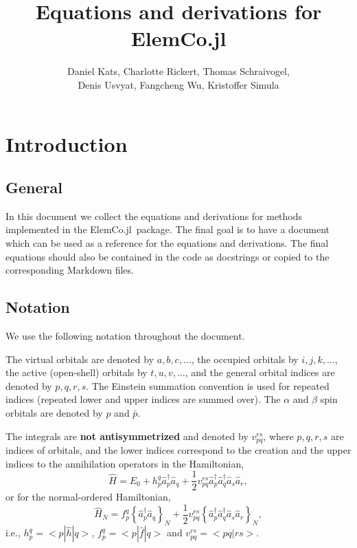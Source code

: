 \documentclass[a4paper,12pt,oneside]{book}
\newcommand{\op}{\hat}
\newcommand{\spa}[1]{{#1}}
\newcommand{\spb}[1]{\bar{#1}}
\newcommand{\elemcoil}{\textsf{ElemCo.jl}}
\begin{document}
\title{Equations and derivations for \elemcoil}
\author{Daniel Kats, Charlotte Rickert, Thomas Schraivogel,\\ Denis Usvyat, Fangcheng Wu, Kristoffer Simula}
\maketitle
\tableofcontents
\chapter{Introduction}
\section{General}
In this document we collect the equations and derivations for methods implemented in the \elemcoil\ package.
The final goal is to have a document which can be used as a reference for the equations and derivations.
The final equations should also be contained in the code as docstrings or copied to the corresponding Markdown files.

\section{Notation} \label{sec:notation}

We use the following notation throughout the document.

The virtual orbitals are denoted by $a,b,c,\ldots$, the occupied orbitals by $i,j,k,\ldots$,
the active (open-shell) orbitals by $t,u,v,\ldots$,
and the general orbital indices are denoted by $p,q,r,s$.
The Einstein summation convention is used for repeated indices (repeated lower and upper indices are summed over).
The $\alpha$ and $\beta$ spin orbitals are denoted by $\spa{p}$ and $\spb{p}$.

The integrals are \textbf{not antisymmetrized} and denoted by $v_{pq}^{rs}$, where $p,q,r,s$ are indices of orbitals,
and the lower indices correspond to the creation and the upper indices to the annihilation operators in the Hamiltonian,
\begin{equation}
  \op H = E_0 + h_p^q \op a^\dagger_p \op a_q + 
  \frac{1}{2} v_{pq}^{rs} \op a^\dagger_p \op a^\dagger_q \op a_s \op a_r,
\end{equation}
or for the normal-ordered Hamiltonian,
\begin{equation}
  \op H_N = f_p^q \left\{\op a^\dagger_p \op a_q\right\}_N + 
  \frac{1}{2} v_{pq}^{rs} \left\{\op a^\dagger_p \op a^\dagger_q \op a_s \op a_r\right\}_N,
\end{equation}
i.e., $h_p^q = <p|\op h|q>$, $f_p^q = <p|\op f|q>$ and $v_{pq}^{rs} = <pq|rs>$.
\end{document}
